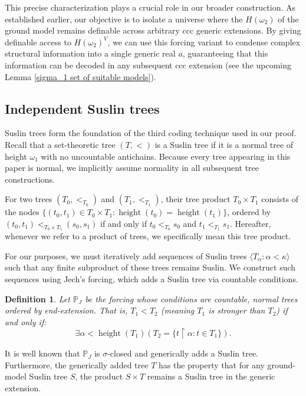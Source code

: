\documentclass[a4paper,11pt]{article}
\newtheorem{definition}[theorem]{Definition}
\newcommand{\forceP}{\mathbb{P}}
\begin{document}
This precise characterization plays a crucial role in our broader construction. As established earlier, our objective is to isolate a universe where the $H(\omega_2)$ of the ground model remains definable across arbitrary ccc generic extensions. By giving definable access to $H(\omega_2)^V$, we can use this forcing variant to condense complex structural information into a single generic real $a$, guaranteeing that this information can be  decoded in any subsequent ccc extension (see the upcoming Lemma \ref{sigma_1 set of suitable models}).


\subsection{Independent Suslin trees}

Suslin trees form the foundation of the third coding technique used in our proof. Recall that a set-theoretic tree $(T, <)$ is a Suslin tree if it is a normal tree of height $\omega_1$ with no uncountable antichains. Because every tree appearing in this paper is normal, we implicitly assume normality in all subsequent tree constructions.

For two trees $(T_0, <_{T_0})$ and $(T_1, <_{T_1})$, their tree product $T_0 \times T_1$ consists of the nodes $\{ (t_0, t_1) \in T_0 \times T_1 : \operatorname{height}(t_0) = \operatorname{height}(t_1) \}$, ordered by $(t_0, t_1) <_{T_0 \times T_1} (s_0, s_1)$ if and only if $t_0 <_{T_0} s_0$ and $t_1 <_{T_1} s_1$. Hereafter, whenever we refer to a product of trees, we specifically mean this tree product.

For our purposes, we must iteratively add sequences of Suslin trees $\langle T_\alpha : \alpha < \kappa \rangle$ such that any finite subproduct of these trees remains Suslin. We construct such sequences using Jech's forcing, which adds a Suslin tree via countable conditions.

\begin{definition}
 Let $\forceP_J$ be the forcing whose conditions are countable, normal trees ordered by end-extension. That is, $T_1 < T_2$ (meaning $T_1$ is stronger than $T_2$) if and only if:
 \[ \exists \alpha < \operatorname{height}(T_1) \left( T_2 = \{ t \upharpoonright \alpha : t \in T_1 \} \right). \]
\end{definition}

It is well known that $\forceP_J$ is $\sigma$-closed and generically adds a Suslin tree. Furthermore, the generically added tree $T$ has the property that for any ground-model Suslin tree $S$, the product $S \times T$ remains a Suslin tree in the generic extension.
\end{document}
